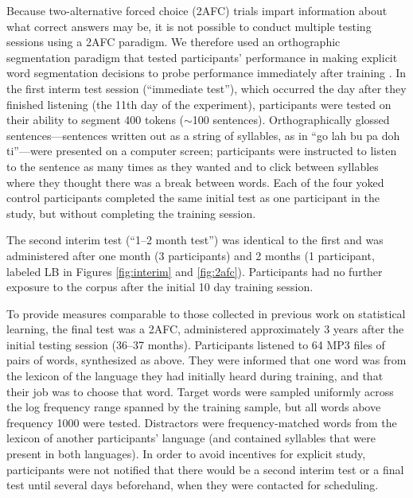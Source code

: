 \documentclass[10pt]{article}
\begin{document}
Because two-alternative forced choice (2AFC) trials impart information about what correct answers may be, it is not possible to conduct multiple testing sessions using a 2AFC paradigm. We therefore used an orthographic segmentation paradigm that tested participants' performance in making explicit word segmentation decisions to probe performance immediately after training \cite{frank2010b,kurumada2011}. 
In the first interm test session (``immediate test''), which occurred the day after they finished listening (the 11th day of the experiment), participants were tested on their ability to segment 400 tokens ($\sim$100 sentences). Orthographically glossed sentences---sentences written out as a string of syllables, as in ``go lah bu pa doh ti''---were presented on a computer screen; participants were instructed to listen to the sentence as many times as they wanted and to click between syllables where they thought there was a break between words. Each of the four yoked control participants completed the same initial test as one participant in the study, but without completing the training session. 

The second interim test (``1--2 month test'') was identical to the first and was administered after one month (3 participants) and 2 months (1 participant, labeled LB in Figures \ref{fig:interim} and \ref{fig:2afc}). Participants had no further exposure to the corpus after the initial 10 day training session. 

To provide measures comparable to those collected in previous work on statistical learning, the final test was a 2AFC, administered approximately 3 years after the initial testing session (36--37 months). Participants listened to 64 MP3 files of pairs of words, synthesized as above. They were informed that one word was from the lexicon of the language they had initially heard during training, and that their job was to choose that word. Target words were sampled uniformly across the log frequency range spanned by the training sample, but all words above frequency 1000 were tested. Distractors were frequency-matched words from the lexicon of another participants' language (and contained syllables that were present in both languages). In order to avoid incentives for explicit study, participants were not notified that there would be a second interim test or a final test until several days beforehand, when they were contacted for scheduling.
\end{document}
